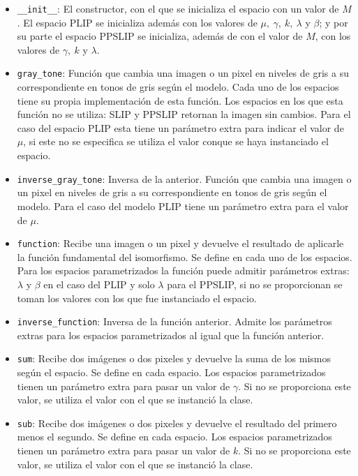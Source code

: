 \begin{itemize}
	\item \verb|__init__|: El constructor, con el que se inicializa el espacio con un valor de $M$. El espacio PLIP se inicializa adem\'as con los valores de $\mu,~\gamma,~k,~\lambda$ y $\beta$; y por su parte el espacio PPSLIP se inicializa, adem\'as de con el valor de $M$, con los valores de $\gamma,~k$ y $\lambda$.
	\item \verb|gray_tone|: Funci\'on que cambia una imagen o un pixel en niveles de gris a su correspondiente en tonos de gris seg\'un el modelo. Cada uno de los espacios tiene su propia implementaci\'on de esta funci\'on. Los espacios en los que esta funci\'on no se utiliza: SLIP y PPSLIP retornan la imagen sin cambios. Para el caso del espacio PLIP esta tiene un par\'ametro extra para indicar el valor de $\mu$, si este no se especifica se utiliza el valor conque se haya instanciado el espacio.
	\item \verb|inverse_gray_tone|: Inversa de la anterior. Funci\'on que cambia una imagen o un pixel en niveles de gris a su correspondiente en tonos de gris seg\'un el modelo. Para el caso del modelo PLIP tiene un par\'ametro extra para el valor de $\mu$.
	\item \verb|function|: Recibe una imagen o un pixel y devuelve el resultado de aplicarle la funci\'on fundamental del isomorfismo. Se define en cada uno de los espacios. Para los espacios parametrizados la funci\'on puede admitir par\'ametros extras: $\lambda$ y $\beta$ en el caso del PLIP y solo $\lambda$ para el PPSLIP, si no se proporcionan se toman los valores con los que fue instanciado el espacio.
	\item \verb|inverse_function|: Inversa de la funci\'on anterior. Admite los par\'ametros extras para los espacios parametrizados al igual que la funci\'on anterior.
	\item \verb|sum|: Recibe dos im\'agenes o dos pixeles y devuelve la suma de los mismos seg\'un el espacio. Se define en cada espacio. Los espacios parametrizados tienen un par\'ametro extra para pasar un valor de $\gamma$. Si no se proporciona este valor, se utiliza el valor con el que se instanci\'o la clase.
	\item  \verb|sub|: Recibe dos im\'agenes o dos pixeles y devuelve el resultado del primero menos el segundo. Se define en cada espacio. Los espacios parametrizados tienen un par\'ametro extra para pasar un valor de $k$. Si no se proporciona este valor, se utiliza el valor con el que se instanci\'o la clase.

\end{itemize}
